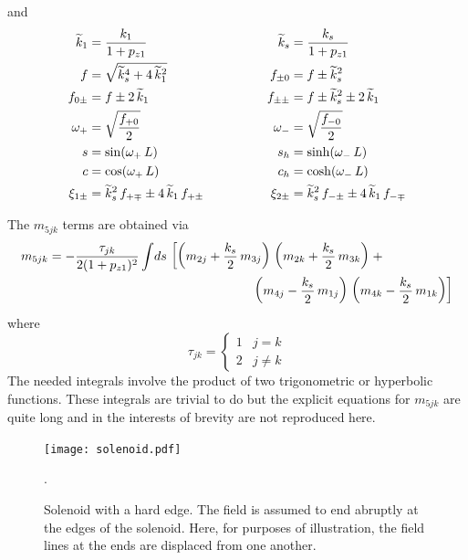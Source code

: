 and
\begin{alignat}{2}
  \widetilde k_1        &= \frac{k_1}{1 + p_{z1}} & \qquad \qquad 
  \widetilde k_s          &= \frac{k_s}{1 + p_{z1}} \nonumber \\
  f            &= \sqrt{\widetilde k_s^4 + 4 \, \widetilde k_1^2} & \qquad \qquad
  f_{\pm0}     &= f \pm \widetilde k_s^2 \nonumber \\
  f_{0\pm}     &= f \pm 2 \, \widetilde k_1 & \qquad \qquad
  f_{\pm\pm}   &= f \pm \widetilde k_s^2 \pm 2 \, \widetilde k_1 \nonumber \\
  \omega_+        &= \sqrt{\frac{f_{+0}}{2}} & \qquad \qquad
  \omega_-        &= \sqrt{\frac{f_{-0}}{2}} \\
  s            &= \sin (\omega_+ \, L) & \qquad \qquad
  s_h          &= \sinh (\omega_- \, L) \nonumber \\
  c            &= \cos (\omega_+ \, L) & \qquad \qquad
  c_h          &= \cosh (\omega_- \, L) \nonumber \\
  \xi_{1\pm} &= \widetilde k_s^2 \, f_{+\mp} \pm 4 \, \widetilde k_1 \, f_{+\pm} & \qquad \qquad
  \xi_{2\pm} &= \widetilde k_s^2 \, f_{-\pm} \pm 4 \, \widetilde k_1 \, f_{-\mp} \nonumber
\end{alignat}

The $m_{5jk}$ terms are obtained via 
\begin{align}
  m_{5jk} = - \frac{\tau_{jk}}{2 (1 + p_{z1})^2} \int \! ds \, 
  & \left[ 
    \left( m_{2j} + \frac{k_s}{2} \, m_{3j} \right) \, 
    \left( m_{2k} + \frac{k_s}{2} \, m_{3k} \right)   
  \right. + \\
  & \hspace*{15ex} \left.
    \left( m_{4j} - \frac{k_s}{2} \, m_{1j} \right) \, 
    \left( m_{4k} - \frac{k_s}{2} \, m_{1k} \right) 
  \right] \nonumber
\end{align}
where
\begin{equation}
  \tau_{jk} = 
  \begin{cases}
    1 & j = k \\
    2 & j \ne k 
  \end{cases}
\end{equation}
The needed integrals involve the product of two trigonometric or
hyperbolic functions. These integrals are trivial to do but the
explicit equations for $m_{5jk}$ are quite long and in the interests of
brevity are not reproduced here.


\begin{figure}[tb]
  \centering
  \texttt{[image: solenoid.pdf]}
  \caption[Solenoid with a hard edge.]
  {
Solenoid with a hard edge. The field is assumed to end abruptly at the edges of the solenoid. Here,
for purposes of illustration, the field lines at the ends are displaced from one another.
  }
  \label{f:solenoid}.
\end{figure}

